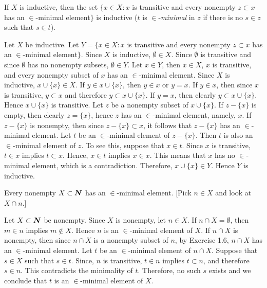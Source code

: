  If $X$ is inductive, then the set $\{ x \in X : x$
is transitive and every nonempty $z \subset x$ has an
$\in$-minimal element$\}$ is inductive ($t$ is
$\in$-\textit{minimal} in $z$ if there is no $s \in z$ such
that $s \in t$).
\begin{solution}
  Let $X$ be inductive. Let $Y = \{ x \in X : x$ is transitive and
  every nonempty $z \subset x$ has an $\in$-minimal element$\}$.
  Since $X$ is inductive, $\emptyset \in X$. Since $\emptyset$ is
  transitive and since $\emptyset$ has no nonempty subsets,
  $\emptyset \in Y$. Let $x \in Y$, then $x \in X$, $x$ is transitive,
  and every nonempty subset of $x$ has an $\in$-minimal element. Since
  $X$ is inductive, $x \cup \{ x \} \in X$. If $y \in x \cup \{ x \}$,
  then $y \in x$ or $y = x$. If $y \in x$, then since $x$ is transitive,
  $y \subset x$ and therefore $y \subset x \cup \{ x \}$. If $y = x$,
  then clearly $ y \subset x \cup \{ x \}$. Hence $x \cup \{ x \}$ is
  transitive. Let $z$ be a nonempty subset of $x \cup \{ x \}$. If 
  $z - \{ x \}$ is empty, then clearly $z = \{ x \}$, hence $z$ has an
  $\in$-minimal element, namely, $x$. If $z - \{ x \}$ is nonempty, then
  since $z - \{ x \} \subset x$, it follows that $z - \{ x \}$ has an
  $\in$-minimal element. Let $t$ be an $\in$-minimal element of
  $z - \{ x \}$. Then $t$ is also an $\in$-minimal element of $z$. To
  see this, suppose that $x \in t$. Since $x$ is transitive, $t \in x$
  implies $t \subset x$. Hence, $x \in t$ implies $x \in x$. This means
  that $x$ has no $\in$-minimal element, which is a contradiction.
  Therefore, $x \cup \{ x \} \in Y$. Hence $Y$ is inductive.
\end{solution}

 Every nonempty $X \subset \boldsymbol{N}$ has an $\in$-minimal element.
[Pick $n \in X$ and look at $X \cap n$.]
\begin{solution}
  Let $X \subset \boldsymbol{N}$ be nonempty. Since $X$ is nonempty, let $n \in X$.
  If $n \cap X = \emptyset$, then $m \in n$ implies $m \notin X$. Hence
  $n$ is an $\in$-minimal element of $X$. If $n \cap X$ is nonempty,
  then since $n \cap X$ is a nonempty subset of $n$, by Exercise 1.6,
  $n \cap X$ has an $\in$-minimal element. Let $t$ be an $\in$-minimal
  element of $n \cap X$. Suppose that $s \in X$ such that $s \in t$.
  Since, $n$ is transitive, $t \in n$ implies $t \subset n$, and
  therefore $s \in n$. This contradicts the minimality of $t$.
  Therefore, no such $s$ exists and we conclude that $t$ is an
  $\in$-minimal element of $X$.
\end{solution}

